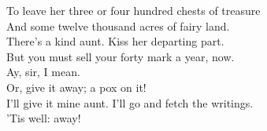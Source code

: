 \documentclass[a4paper,oneside,12pt]{memoir}
\begin{document}
\begin{drama*}
To leave her three or four hundred chests of treasure\\
And some twelve thousand acres of fairy land.\\
\subtlespeaks There's a kind aunt. Kiss her departing part.\\
But you must sell your forty mark a year, now.\\
\dapperspeaks Ay, sir, I mean.\\
\subtlespeaks {} Or, give it away; a pox on it!\\
\dapperspeaks I'll give it mine aunt. I'll go and fetch the writings.\\
\subtlespeaks 'Tis well: away!\\

\scene


\end{drama*}
\end{document}
